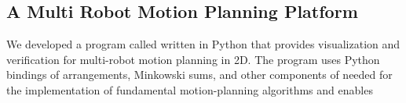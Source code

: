 \subsection{A Multi Robot Motion Planning Platform}
\label{ssec:discopygal}
We developed a program called \disco{} written in Python that provides
visualization and verification for multi-robot motion planning in 2D.
The program uses Python bindings of \cgal{} arrangements, \cgal{}
Minkowski sums, and other components of \cgal{} needed for the
implementation of fundamental motion-planning algorithms and enables
